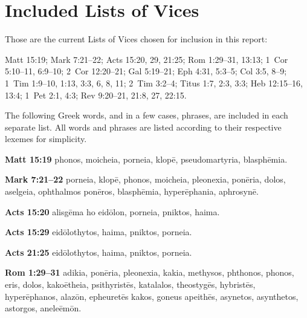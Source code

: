 \section{Included Lists of Vices}
\label{inc_list_vices}
Those are the current Lists of Vices chosen for inclusion in this report:

Matt 15:19; Mark 7:21--22; Acts 15:20, 29, 21:25; Rom 1:29--31, 13:13; 1~Cor 5:10--11, 6:9--10; 2~Cor 12:20--21; Gal 5:19--21; Eph 4:31, 5:3--5; Col 3:5, 8--9; 1~Tim 1:9--10, 1:13, 3:3, 6, 8, 11; 2~Tim 3:2--4; Titus 1:7, 2:3, 3:3; Heb 12:15--16, 13:4; 1~Pet 2:1, 4:3; Rev 9:20--21, 21:8, 27, 22:15.

The following Greek words, and in a few cases, phrases, are included in each separate list. All words and phrases are listed according to their respective lexemes for simplicity.

\textbf{Matt 15:19} \gls{phonos}, \gls{moicheia}, \gls{porneia}, \gls{klopē}, \gls{pseudomartyria}, \gls{blasphēmia}.

\textbf{Mark 7:21--22} \gls{porneia}, \gls{klopē}, \gls{phonos}, %
 \gls{moicheia}, \gls{pleonexia}, \gls{ponēria}, \gls{dolos}, \gls{aselgeia}, \gls{ophthalmos ponēros}, \gls{blasphēmia}, \gls{hyperēphania}, \gls{aphrosynē}. %

\textbf{Acts 15:20} \gls{alisgēma ho eidōlon}, \gls{porneia}, \gls{pniktos}, \gls{haima}.

\textbf{Acts 15:29} \gls{eidōlothytos}, \gls{haima}, \gls{pniktos}, \gls{porneia}.

\textbf{Acts 21:25} \gls{eidōlothytos}, \gls{haima}, \gls{pniktos}, \gls{porneia}.

\textbf{Rom 1:29--31} \gls{adikia}, \gls{ponēria}, \gls{pleonexia}, \gls{kakia}, \gls{methysos}, \gls{phthonos}, \gls{phonos}, \gls{eris}, \gls{dolos}, \gls{kakoētheia}, \gls{psithyristēs}, %
\gls{katalalos}, \gls{theostygēs}, \gls{hybristēs}, \gls{hyperēphanos}, \gls{alazōn}, \gls{epheuretēs kakos}, \gls{goneus apeithēs}, %
\gls{asynetos}, \gls{asynthetos}, \gls{astorgos}, \gls{aneleēmōn}. %

